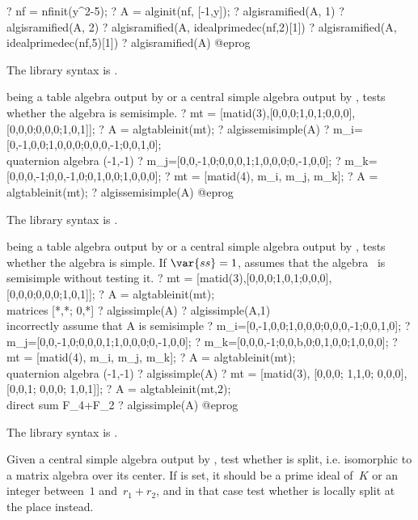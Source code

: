 \bprog
? nf = nfinit(y^2-5);
? A = alginit(nf, [-1,y]);
? algisramified(A, 1)
? algisramified(A, 2)
? algisramified(A, idealprimedec(nf,2)[1])
? algisramified(A, idealprimedec(nf,5)[1])
? algisramified(A)
@eprog

The library syntax is .

\label{se:algissemisimple}
 being a table algebra output by  or a central
simple algebra output by , tests whether the algebra  is
semisimple.
\bprog
? mt = [matid(3),[0,0,0;1,0,1;0,0,0],[0,0,0;0,0,0;1,0,1]];
? A = algtableinit(mt);
? algissemisimple(A)
? m_i=[0,-1,0,0;1,0,0,0;0,0,0,-1;0,0,1,0]; \\quaternion algebra (-1,-1)
? m_j=[0,0,-1,0;0,0,0,1;1,0,0,0;0,-1,0,0];
? m_k=[0,0,0,-1;0,0,-1,0;0,1,0,0;1,0,0,0];
? mt = [matid(4), m_i, m_j, m_k];
? A = algtableinit(mt);
? algissemisimple(A)
@eprog

The library syntax is .

\label{se:algissimple}
 being a table algebra output by  or a central
simple algebra output by , tests whether the algebra  is
simple. If $\var{ss}=1$, assumes that the algebra~ is semisimple
without testing it.
\bprog
? mt = [matid(3),[0,0,0;1,0,1;0,0,0],[0,0,0;0,0,0;1,0,1]];
? A = algtableinit(mt); \\ matrices [*,*; 0,*]
? algissimple(A)
? algissimple(A,1) \\ incorrectly assume that A is semisimple
? m_i=[0,-1,0,0;1,0,0,0;0,0,0,-1;0,0,1,0];
? m_j=[0,0,-1,0;0,0,0,1;1,0,0,0;0,-1,0,0];
? m_k=[0,0,0,-1;0,0,b,0;0,1,0,0;1,0,0,0];
? mt = [matid(4), m_i, m_j, m_k];
? A = algtableinit(mt); \\ quaternion algebra (-1,-1)
? algissimple(A)
? mt = [matid(3), [0,0,0; 1,1,0; 0,0,0], [0,0,1; 0,0,0; 1,0,1]];
? A = algtableinit(mt,2); \\ direct sum F_4+F_2
? algissimple(A)
@eprog

The library syntax is .

\label{se:algissplit}
Given a central simple algebra  output by , test
whether  is split, i.e. isomorphic to a matrix algebra over its center.
If  is set, it should be a prime ideal of~$K$ or an integer between~$1$
and~$r_1+r_2$, and in that case test whether  is locally split at the
place  instead.

